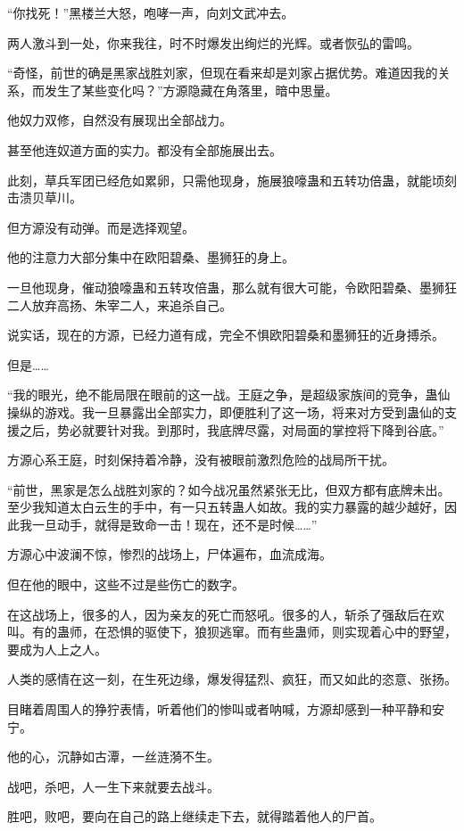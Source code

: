 \begin{this_body}
“你找死！”黑楼兰大怒，咆哮一声，向刘文武冲去。

两人激斗到一处，你来我往，时不时爆发出绚烂的光辉。或者恢弘的雷鸣。

“奇怪，前世的确是黑家战胜刘家，但现在看来却是刘家占据优势。难道因我的关系，而发生了某些变化吗？”方源隐藏在角落里，暗中思量。

他奴力双修，自然没有展现出全部战力。

甚至他连奴道方面的实力。都没有全部施展出去。

此刻，草兵军团已经危如累卵，只需他现身，施展狼嚎蛊和五转功倍蛊，就能顷刻击溃贝草川。

但方源没有动弹。而是选择观望。

他的注意力大部分集中在欧阳碧桑、墨狮狂的身上。

一旦他现身，催动狼嚎蛊和五转攻倍蛊，那么就有很大可能，令欧阳碧桑、墨狮狂二人放弃高扬、朱宰二人，来追杀自己。

说实话，现在的方源，已经力道有成，完全不惧欧阳碧桑和墨狮狂的近身搏杀。

但是……

“我的眼光，绝不能局限在眼前的这一战。王庭之争，是超级家族间的竞争，蛊仙操纵的游戏。我一旦暴露出全部实力，即便胜利了这一场，将来对方受到蛊仙的支援之后，势必就要针对我。到那时，我底牌尽露，对局面的掌控将下降到谷底。”

方源心系王庭，时刻保持着冷静，没有被眼前激烈危险的战局所干扰。

“前世，黑家是怎么战胜刘家的？如今战况虽然紧张无比，但双方都有底牌未出。至少我知道太白云生的手中，有一只五转蛊人如故。我的实力暴露的越少越好，因此我一旦动手，就得是致命一击！现在，还不是时候……”

方源心中波澜不惊，惨烈的战场上，尸体遍布，血流成海。

但在他的眼中，这些不过是些伤亡的数字。

在这战场上，很多的人，因为亲友的死亡而怒吼。很多的人，斩杀了强敌后在欢叫。有的蛊师，在恐惧的驱使下，狼狈逃窜。而有些蛊师，则实现着心中的野望，要成为人上之人。

人类的感情在这一刻，在生死边缘，爆发得猛烈、疯狂，而又如此的恣意、张扬。

目睹着周围人的狰狞表情，听着他们的惨叫或者呐喊，方源却感到一种平静和安宁。

他的心，沉静如古潭，一丝涟漪不生。

战吧，杀吧，人一生下来就要去战斗。

胜吧，败吧，要向在自己的路上继续走下去，就得踏着他人的尸首。


\end{this_body}
